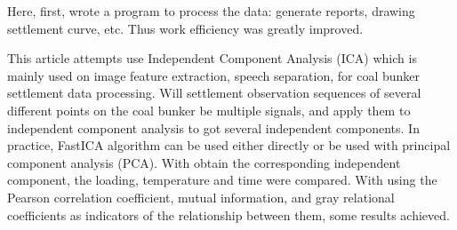 {Here, first, wrote a program to process the data: 
generate reports, drawing settlement curve, etc.
Thus work efficiency was greatly improved.

This article attempts use Independent Component Analysis (ICA) 
which is mainly used on image feature extraction, 
speech separation, for coal bunker settlement data processing.
Will settlement observation sequences of several different points on the coal bunker be multiple signals, 
and apply them to independent component analysis to got several independent components.
In practice, FastICA algorithm can be used either directly or be used with principal component analysis (PCA). 
With obtain the corresponding independent component, the loading, temperature and time were compared.
With using the Pearson correlation coefficient, mutual information, 
and gray relational coefficients as indicators of the relationship between them,
some results achieved.
}


\makecover 
